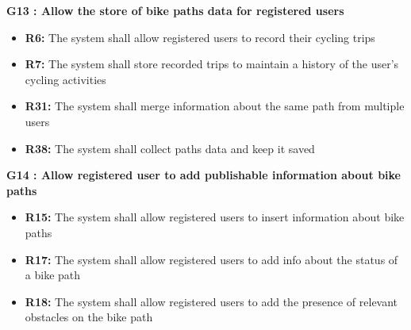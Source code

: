 \textbf{G13 : Allow the store of bike paths data for registered users}
\begin{itemize}
    \item \textbf{R6:} The system shall allow registered users to record their cycling trips
    \item \textbf{R7:} The system shall store recorded trips to maintain a history of the user's cycling activities
    \item \textbf{R31:} The system shall merge information about the same path from multiple users
    \item \textbf{R38:} The system shall collect paths data and keep it saved
\end{itemize}
\vspace{1cm}

\textbf{G14 : Allow registered user to add publishable information about bike paths}
\begin{itemize}
    \item \textbf{R15:} The system shall allow registered users to insert information about bike paths
    \item \textbf{R17:} The system shall allow registered users to add info about the status of a bike path
    \item \textbf{R18:} The system shall allow registered users to add the presence of relevant obstacles on the bike path
\end{itemize}

\newpage
\renewcommand{\arraystretch}{1.2}
\setlength{\tabcolsep}{4pt}

